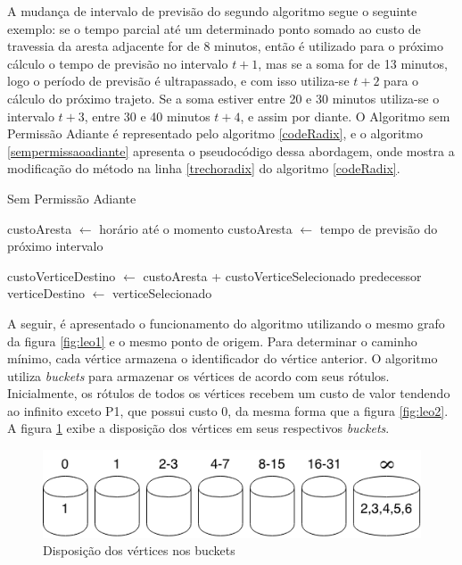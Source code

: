 A mudança de intervalo de previsão do segundo algoritmo segue o seguinte exemplo: se o tempo parcial até um determinado 
ponto somado ao custo de travessia da aresta adjacente for de 8 minutos, então é utilizado para o próximo cálculo o tempo
de previsão no intervalo $t + 1$, mas se a soma for de 13 minutos, logo o período de previsão é ultrapassado, e com isso
utiliza-se $t + 2$ para o cálculo do próximo trajeto. Se a soma estiver entre 20 e 30 minutos utiliza-se o intervalo
$t + 3$, entre 30 e 40 minutos $t + 4$, e assim por diante.
O Algoritmo sem Permissão Adiante é representado pelo algoritmo \ref{codeRadix}, e o algoritmo \ref{sempermissaoadiante}
apresenta o pseudocódigo dessa abordagem, onde mostra a modificação do método na linha \ref{trechoradix} do
algoritmo \ref{codeRadix}.

\begin{algorithm}
\caption{Sem Permissão Adiante}
\begin{algorithmic}[1]
\State custoAresta $\leftarrow$ horário até o momento
  \State custoAresta $\leftarrow$ tempo de previsão do próximo intervalo
\EndIf

  \State custoVerticeDestino $\leftarrow$ custoAresta + custoVerticeSelecionado
  \State predecessor verticeDestino $\leftarrow$ verticeSelecionado 
\EndIf
\end{algorithmic}
\label{sempermissaoadiante}
\end{algorithm}
\FloatBarrier

A seguir, é apresentado o funcionamento do algoritmo utilizando o mesmo grafo da figura \ref{fig:leo1}
e o mesmo ponto de origem. Para determinar o caminho mínimo, cada vértice armazena o identificador do vértice anterior.
O algoritmo utiliza \textit{buckets} para armazenar os vértices de acordo com seus rótulos.
Inicialmente, os rótulos de todos os vértices recebem um custo de valor tendendo ao infinito exceto P1,
que possui custo 0, da mesma forma que a figura \ref{fig:leo2}. A figura \ref{fig:buckets} exibe a disposição dos vértices em seus
respectivos \textit{buckets}.

\begin{figure}[htbp]
\centering
 \includegraphics[width=.50\textwidth]{chapters/fig/buckets.png}
\caption{Disposição dos vértices nos buckets}
\label{fig:buckets}
\end{figure}
\FloatBarrier


